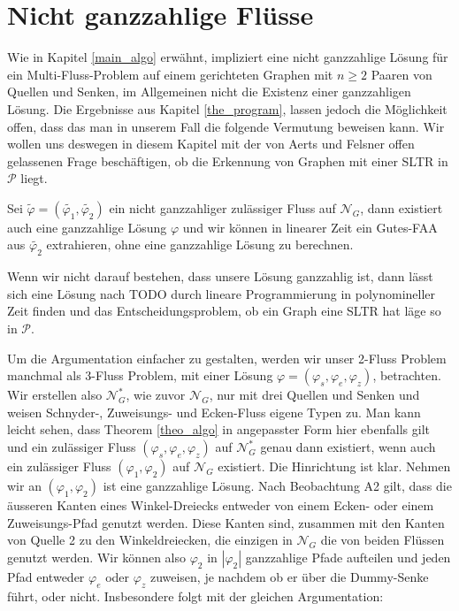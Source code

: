\chapter{Nicht ganzzahlige Flüsse}

Wie in Kapitel \ref{main_algo} erwähnt, impliziert eine nicht ganzzahlige Lösung für ein Multi-Fluss-Problem auf einem gerichteten Graphen mit $n\geq 2$ Paaren von Quellen und Senken, im Allgemeinen nicht die Existenz einer ganzzahligen Lösung. Die Ergebnisse aus Kapitel \ref{the_program}, lassen jedoch die Möglichkeit offen, dass das man in unserem Fall die folgende Vermutung beweisen kann. Wir wollen uns deswegen in diesem Kapitel mit der von Aerts und Felsner offen gelassenen Frage beschäftigen, ob die Erkennung von Graphen mit einer SLTR in $\mathcal{P}$ liegt.

\begin{conjecture}\label{int_conj}
Sei $\tilde{\varphi}=(\tilde{\varphi_1},\tilde{\varphi_2})$ ein nicht ganzzahliger zulässiger Fluss auf $\mathcal{N}_G$, dann existiert auch eine ganzzahlige Lösung $\varphi$ und wir können in linearer Zeit ein Gutes-FAA aus $\tilde{\varphi_2}$ extrahieren, ohne eine ganzzahlige Lösung zu berechnen.
\end{conjecture}

\begin{remark}
Wenn wir nicht darauf bestehen, dass unsere Lösung ganzzahlig ist, dann lässt sich eine Lösung nach TODO durch lineare Programmierung in polynomineller Zeit finden und das Entscheidungsproblem, ob ein Graph eine SLTR hat läge so in $\mathcal{P}$.
\end{remark}

Um die Argumentation einfacher zu gestalten, werden wir unser 2-Fluss Problem manchmal als 3-Fluss Problem, mit einer Lösung $\varphi=(\varphi_s,\varphi_e,\varphi_z)$, betrachten. Wir erstellen also $\mathcal{N}_G^*$, wie zuvor $\mathcal{N}_G$, nur mit drei Quellen und Senken und weisen Schnyder-, Zuweisungs- und Ecken-Fluss eigene Typen zu. Man kann leicht sehen, dass Theorem \ref{theo_algo} in angepasster Form hier ebenfalls gilt und ein zulässiger  Fluss $(\varphi_s,\varphi_e,\varphi_z)$ auf $\mathcal{N}_G^*$ genau dann existiert, wenn auch ein zulässiger Fluss $(\varphi_1,\varphi_2)$ auf $\mathcal{N}_G$ existiert. Die Hinrichtung ist klar. Nehmen wir an $(\varphi_1,\varphi_2)$ ist eine ganzzahlige Lösung. Nach Beobachtung A2 gilt, dass die äusseren Kanten eines Winkel-Dreiecks entweder von einem Ecken- oder einem Zuweisungs-Pfad genutzt werden. Diese Kanten sind, zusammen mit den Kanten von Quelle 2 zu den Winkeldreiecken, die einzigen in $\mathcal{N}_G$ die von beiden Flüssen genutzt werden. Wir können also $\varphi_2$ in $|\varphi_2|$ ganzzahlige Pfade aufteilen und jeden Pfad entweder $\varphi_e$ oder $\varphi_z$ zuweisen, je nachdem ob er über die Dummy-Senke führt, oder nicht. Insbesondere folgt mit der gleichen Argumentation:  

